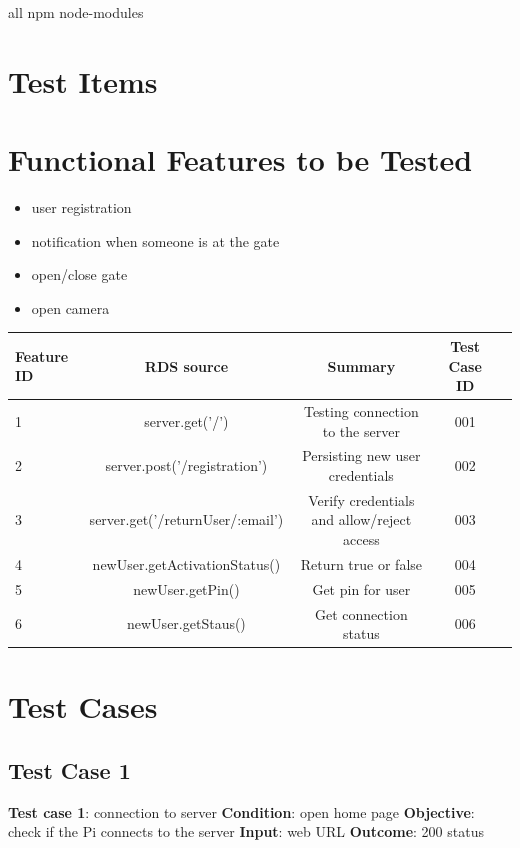 \documentclass[a4paper,12pt]{article}
\begin{document}
			all npm node-modules
\section{Test Items}
	\section{Functional Features to be Tested}
		\begin{itemize}
				\item user registration
				\item notification when someone is at the gate
				\item open/close gate
				\item open camera
		\end{itemize}
		
		
		\begin{tabular}{p{0.1cm}c c c c}
			Feature ID & RDS source & Summary & Test Case ID\\ [0.5ex]
			\hline
			
			1 & server.get('/')& Testing connection to the server & 001 \\
			2 & server.post('/registration') & Persisting new user credentials & 002 \\
			3 & server.get('/returnUser/:email') & Verify credentials and allow/reject access & 003 \\
			4 & newUser.getActivationStatus() & Return true or false & 004 \\
			5 & newUser.getPin() & Get pin for user & 005 \\
			6 & newUser.getStaus() & Get connection status & 006 \\
		\end{tabular}
	\section{Test Cases}
		\subsection{Test Case 1}
		\textbf{Test case 1}: connection to server \newline
		\textbf{Condition}: open home page \newline
		\textbf{Objective}: check if the Pi connects to the server \newline
		\textbf{Input}: web URL \newline
		\textbf{Outcome}:  200 status \newline
		
\end{document}
